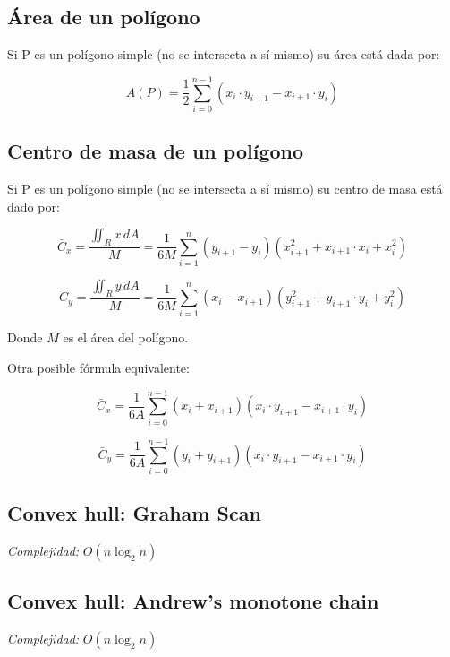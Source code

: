 \documentclass[10pt,letterpaper,twocolumn]{article}
\newcommand{\codigofuente}[1]{

\dotfill
}
\begin{document}
\subsection{Área de un polígono}
Si P es un polígono simple (no se intersecta a sí mismo) su área está dada por:

$$ A(P) = \frac{1}{2} \displaystyle\sum_{i=0}^{n-1} (x_{i} \cdot y_{i+1} - x_{i+1} \cdot y_{i}) $$

\bigskip
\codigofuente{./src/geometria/polygon_area.cpp}

\subsection{Centro de masa de un polígono}
Si P es un polígono simple (no se intersecta a sí mismo) su centro de masa está dado por:


$$ \displaystyle\bar{C}_{x} = \frac{ \displaystyle\iint_{R} x \, dA }{M} = \frac{1}{6M}\sum_{i=1}^{n} (y_{i+1} - y_{i}) (x_{i+1}^2 + x_{i+1} \cdot x_{i} + x_{i}^2) $$

\medskip

$$ \displaystyle\bar{C}_{y} = \frac{ \displaystyle\iint_{R} y \, dA }{M} = \frac{1}{6M} \sum_{i=1}^{n} (x_{i} - x_{i+1}) (y_{i+1}^2 + y_{i+1} \cdot y_{i} + y_{i}^2) $$

\medskip

Donde $ M $ es el área del polígono.

Otra posible fórmula equivalente:

$$ \displaystyle\bar{C}_{x} = \frac{1}{6A} \sum_{i=0}^{n-1} (x_{i} + x_{i+1}) (x_{i} \cdot y_{i+1} - x_{i+1} \cdot y_{i}) $$

\medskip

$$ \displaystyle\bar{C}_{y} = \frac{1}{6A} \sum_{i=0}^{n-1} (y_{i} + y_{i+1}) (x_{i} \cdot y_{i+1} - x_{i+1} \cdot y_{i}) $$


\subsection{Convex hull: Graham Scan}
\emph{Complejidad:} $ O(n \log_{2}{n}) $
\codigofuente{./src/geometria/grahamscan.cpp}

\subsection{Convex hull: Andrew's monotone chain}
\emph{Complejidad:} $ O(n \log_{2}{n}) $
\codigofuente{./src/geometria/monotonechain.cpp}
\end{document}
